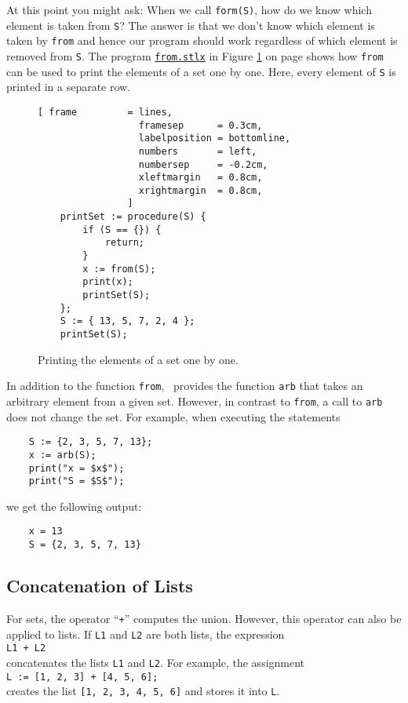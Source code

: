 At this point you might ask: When we call \texttt{form(S)}, how do we
know which element is taken from \texttt{S}?  The answer is that we don't know which element is
taken by \texttt{from} and hence our program should work regardless of which element is removed from
\texttt{S}. The program 
\href{https://github.com/karlstroetmann/Logik/blob/master/SetlX/from.stlx}{\texttt{from.stlx}}
in Figure \ref{fig:from.stlx} on page
\pageref{fig:from.stlx} shows how \texttt{from} can be used to print the elements of a set one by
one.  Here, every element of \texttt{S} is printed in a separate row.


\begin{figure}[!ht]
  \centering
\begin{Verbatim}[ frame         = lines, 
                  framesep      = 0.3cm, 
                  labelposition = bottomline,
                  numbers       = left,
                  numbersep     = -0.2cm,
                  xleftmargin   = 0.8cm,
                  xrightmargin  = 0.8cm,
                ]
    printSet := procedure(S) {
        if (S == {}) {
            return;
        }
        x := from(S);
        print(x);
        printSet(S);
    };
    S := { 13, 5, 7, 2, 4 };
    printSet(S);
\end{Verbatim} 
\vspace*{-0.3cm}
\caption{Printing the elements of a set one by one.}  \label{fig:from.stlx}
\end{figure} 

In addition to the function \texttt{from}, \setlx\ provides the function \texttt{arb} that takes an
arbitrary element from a given set.  However, in contrast to \texttt{from}, a call to \texttt{arb}
does not change the set.  For example, when executing the statements 
\begin{verbatim}
    S := {2, 3, 5, 7, 13};
    x := arb(S);
    print("x = $x$");
    print("S = $S$");
\end{verbatim}
we get the following output:
\begin{verbatim}
    x = 13
    S = {2, 3, 5, 7, 13}
\end{verbatim}

\subsection{Concatenation of Lists}
For sets, the operator ``\texttt{+}'' computes the union.  However, this operator can also be
applied to lists.  If \texttt{L1} and \texttt{L2} are both lists, the expression
\\[0.2cm]
\hspace*{1.3cm}
\texttt{L1 + L2}
\\[0.2cm]
concatenates the lists \texttt{L1} and \texttt{L2}.  For example, the assignment
\\[0.2cm]
\hspace*{1.3cm}
\texttt{L := [1, 2, 3] + [4, 5, 6];}
\\[0.2cm]
creates the list \texttt{[1, 2, 3, 4, 5, 6]} and stores it into \texttt{L}.

